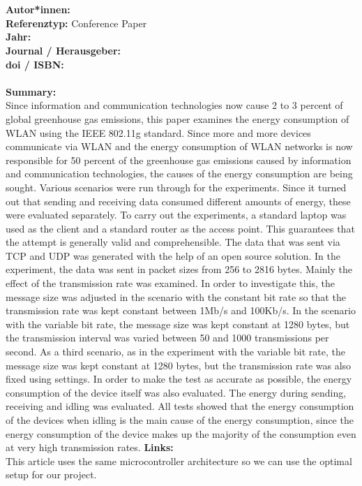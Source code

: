 \documentclass{report}
\newcommand{\createConferencePaperHeader}[1]{
    {\let\clearpage\relax \chapter{\citetitle{#1}}}
    \noindent
    \textbf{Autor*innen:} \citeauthor{#1} \\
    \textbf{Referenztyp:} Conference Paper\\
    \textbf{Jahr:} \citeyear{#1} \\
    \textbf{Journal / Herausgeber:} \citelist{#1}{publisher}\\
    \textbf{doi / ISBN:} \citefield{#1}{doi} \\\\
    \textbf{Summary:}\\
}
\begin{document}
\createConferencePaperHeader{gomez_analysing_2011}
Since information and communication technologies now cause 2 to 3 percent of global greenhouse gas emissions, this paper examines the energy consumption of WLAN using the IEEE 802.11g standard. Since more and more devices communicate via WLAN and the energy consumption of WLAN networks is now responsible for 50 percent of the greenhouse gas emissions caused by information and communication technologies, the causes of the energy consumption are being sought. Various scenarios were run through for the experiments. Since it turned out that sending and receiving data consumed different amounts of energy, these were evaluated separately.\linebreak
To carry out the experiments, a standard laptop was used as the client and a standard router as the access point. This guarantees that the attempt is generally valid and comprehensible. The data that was sent via TCP and UDP was generated with the help of an open source solution. In the experiment, the data was sent in packet sizes from 256 to 2816 bytes. Mainly the effect of the transmission rate was examined. In order to investigate this, the message size was adjusted in the scenario with the constant bit rate so that the transmission rate was kept constant between 1Mb/s and 100Kb/s. In the scenario with the variable bit rate, the message size was kept constant at 1280 bytes, but the transmission interval was varied between 50 and 1000 transmissions per second. As a third scenario, as in the experiment with the variable bit rate, the message size was kept constant at 1280 bytes, but the transmission rate was also fixed using settings. In order to make the test as accurate as possible, the energy consumption of the device itself was also evaluated. The energy during sending, receiving and idling was evaluated. All tests showed that the energy consumption of the devices when idling is the main cause of the energy consumption, since the energy consumption of the device makes up the majority of the consumption even at very high transmission rates.\linebreak\linebreak
\textbf{Links:}\\
This article uses the same microcontroller architecture so we can use the optimal setup for our project.
\pagebreak

\printbibliography
\end{document}
